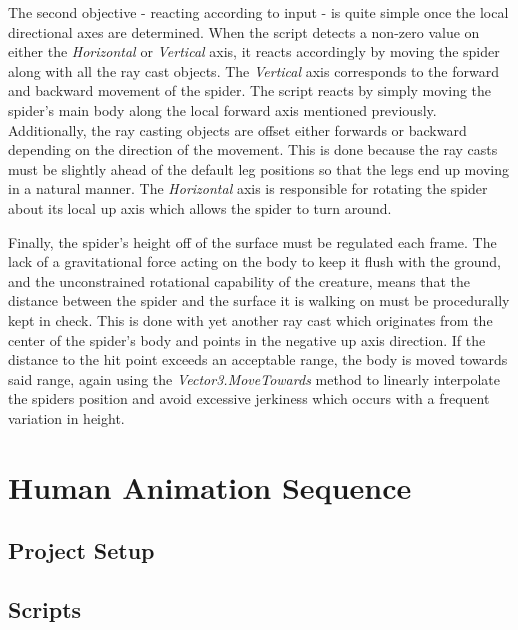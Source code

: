 The second objective - reacting according to input - is quite simple once the
local directional axes are determined. When the script detects a non-zero value
on either the \textit{Horizontal} or \textit{Vertical} axis, it reacts
accordingly by moving the spider along with all the ray cast objects. The
\textit{Vertical} axis corresponds to the forward and backward movement of the
spider. The script reacts by simply moving the spider's main body along the
local forward axis mentioned previously. Additionally, the ray casting objects
are offset either forwards or backward depending on the direction of the
movement. This is done because the ray casts must be slightly ahead of the
default leg positions so that the legs end up moving in a natural manner.
The \textit{Horizontal} axis is responsible for rotating the spider about its
local up axis which allows the spider to turn around. 

Finally, the spider's height off of the surface must be regulated each frame.
The lack of a gravitational force acting on the body to keep it flush with the
ground, and the unconstrained rotational capability of the creature, means that
the distance between the spider and the surface it is walking on must be
procedurally kept in check. This is done with yet another ray cast which
originates from the center of the spider's body and points in the negative up
axis direction. If the distance to the hit point exceeds an acceptable range,
the body is moved towards said range, again using the
\textit{Vector3.MoveTowards} method to linearly interpolate the spiders position
and avoid excessive jerkiness which occurs with a frequent variation in height. 



\section{Human Animation Sequence}
\subsection{Project Setup}
\subsection{Scripts}
